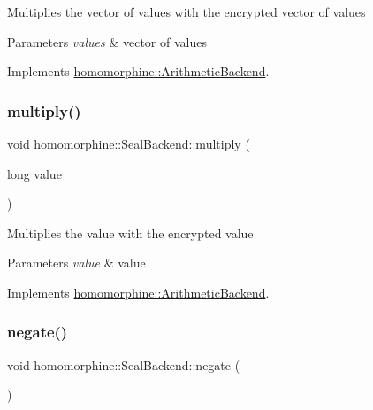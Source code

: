 Multiplies the vector of values with the encrypted vector of values


\begin{DoxyParams}{Parameters}
{\em values} & vector of values \\
\hline
\end{DoxyParams}


Implements \hyperlink{classhomomorphine_1_1_arithmetic_backend_a80f2424d26fcfad4803f6a0e5a9cdd2d}{homomorphine\+::\+Arithmetic\+Backend}.

\mbox{\label{classhomomorphine_1_1_seal_backend_afd8f13068d81c0038b966df4219e8033}} 
\subsubsection{\texorpdfstring{multiply()}{multiply()}\hspace{0.1cm}{\footnotesize\ttfamily [2/2]}}
{\footnotesize\ttfamily void homomorphine\+::\+Seal\+Backend\+::multiply (\begin{DoxyParamCaption}\item[{long}]{value }\end{DoxyParamCaption})\hspace{0.3cm}{\ttfamily [virtual]}}

Multiplies the value with the encrypted value


\begin{DoxyParams}{Parameters}
{\em value} & value \\
\hline
\end{DoxyParams}


Implements \hyperlink{classhomomorphine_1_1_arithmetic_backend_a22f4c598c5a3987ef6efe5925f4c5b81}{homomorphine\+::\+Arithmetic\+Backend}.

\mbox{\label{classhomomorphine_1_1_seal_backend_a9064cf9822de85af9120528cef084bea}} 
\subsubsection{\texorpdfstring{negate()}{negate()}}
{\footnotesize\ttfamily void homomorphine\+::\+Seal\+Backend\+::negate (\begin{DoxyParamCaption}{ }\end{DoxyParamCaption})\hspace{0.3cm}{\ttfamily [virtual]}}

